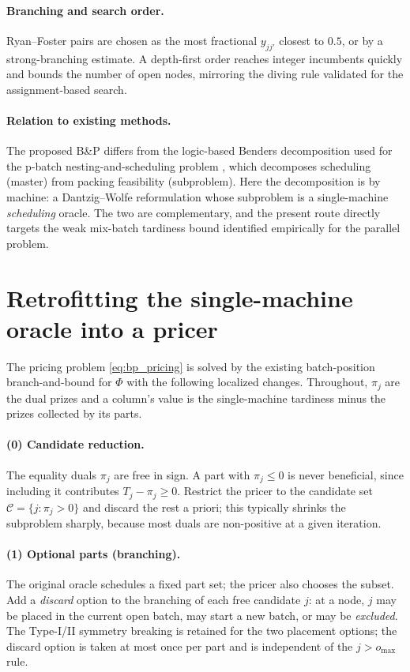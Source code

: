 \documentclass[review,3p,times,authoryear]{elsarticle}
\begin{document}
\paragraph{Branching and search order.} Ryan--Foster pairs are chosen as the most
fractional $y_{jj'}$ closest to $0.5$, or by a strong-branching estimate. A
depth-first order reaches integer incumbents quickly and bounds the number of open
nodes, mirroring the diving rule validated for the assignment-based search.

\paragraph{Relation to existing methods.} The proposed B\&P differs from the
logic-based Benders decomposition used for the p-batch nesting-and-scheduling
problem \citep{nascimento2024}, which decomposes scheduling (master) from packing
feasibility (subproblem). Here the decomposition is by machine: a Dantzig--Wolfe
reformulation whose subproblem is a single-machine \emph{scheduling} oracle. The
two are complementary, and the present route directly targets the weak
mix-batch tardiness bound identified empirically for the parallel problem.

\section{Retrofitting the single-machine oracle into a pricer}
\label{sec:bp_retrofit}

The pricing problem \eqref{eq:bp_pricing} is solved by the existing
batch-position branch-and-bound for $\Phi$ with the following localized changes.
Throughout, $\pi_j$ are the dual prizes and a column's value is the
single-machine tardiness minus the prizes collected by its parts.

\paragraph{(0) Candidate reduction.} The equality duals $\pi_j$ are free in sign.
A part with $\pi_j\le 0$ is never beneficial, since including it contributes
$T_j-\pi_j\ge 0$. Restrict the pricer to the candidate set
$\mathcal{C}=\{j:\pi_j>0\}$ and discard the rest a priori; this typically shrinks
the subproblem sharply, because most duals are non-positive at a given iteration.

\paragraph{(1) Optional parts (branching).} The original oracle schedules a fixed
part set; the pricer also chooses the subset. Add a \emph{discard} option to the
branching of each free candidate $j$: at a node, $j$ may be placed in the current
open batch, may start a new batch, or may be \emph{excluded}. The Type-I/II
symmetry breaking is retained for the two placement options; the discard option is
taken at most once per part and is independent of the $j>o_{\max}$ rule.
\end{document}
